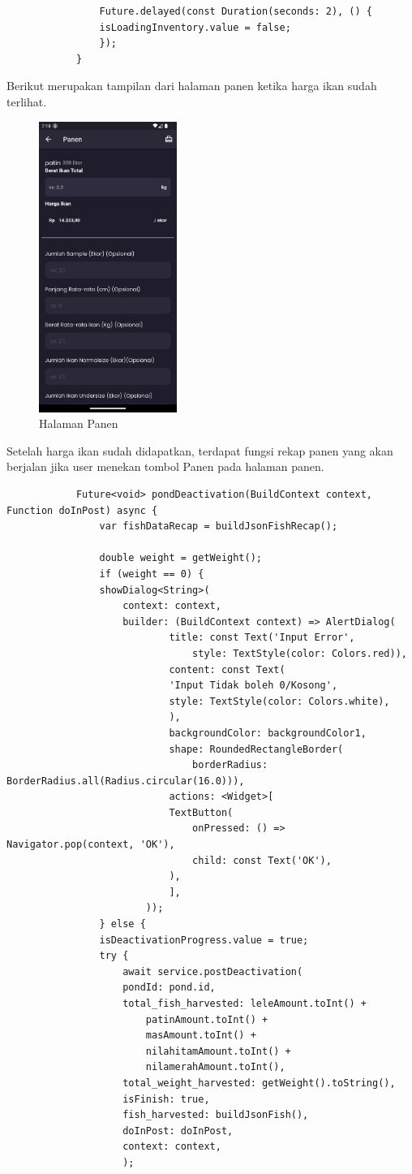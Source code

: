 \begin{spacing}{1.5}
\begin{enumerate}
\begin{lstlisting}
				Future.delayed(const Duration(seconds: 2), () {
				isLoadingInventory.value = false;
				});
			}
		\end{lstlisting}

		Berikut merupakan tampilan dari halaman panen ketika harga ikan sudah terlihat.

		\begin{figure}[H]
			\centering
			\includegraphics[width=0.4\textwidth]{gambar/sprint5/panen.png}
			\caption{Halaman Panen}
		\end{figure}
		
		Setelah harga ikan sudah didapatkan, terdapat fungsi rekap panen yang akan berjalan jika user menekan tombol Panen pada halaman panen.

		\begin{lstlisting}
			Future<void> pondDeactivation(BuildContext context, Function doInPost) async {
				var fishDataRecap = buildJsonFishRecap();

				double weight = getWeight();
				if (weight == 0) {
				showDialog<String>(
					context: context,
					builder: (BuildContext context) => AlertDialog(
							title: const Text('Input Error',
								style: TextStyle(color: Colors.red)),
							content: const Text(
							'Input Tidak boleh 0/Kosong',
							style: TextStyle(color: Colors.white),
							),
							backgroundColor: backgroundColor1,
							shape: RoundedRectangleBorder(
								borderRadius: BorderRadius.all(Radius.circular(16.0))),
							actions: <Widget>[
							TextButton(
								onPressed: () => Navigator.pop(context, 'OK'),
								child: const Text('OK'),
							),
							],
						));
				} else {
				isDeactivationProgress.value = true;
				try {
					await service.postDeactivation(
					pondId: pond.id,
					total_fish_harvested: leleAmount.toInt() +
						patinAmount.toInt() +
						masAmount.toInt() +
						nilahitamAmount.toInt() +
						nilamerahAmount.toInt(),
					total_weight_harvested: getWeight().toString(),
					isFinish: true,
					fish_harvested: buildJsonFish(),
					doInPost: doInPost,
					context: context,
					);


\end{lstlisting}
\end{enumerate}
\end{spacing}
